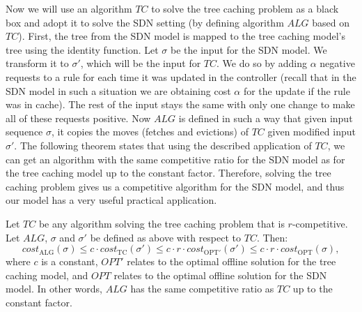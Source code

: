 Now we will use an algorithm $TC$ to solve the tree caching problem as a black
box and adopt it to solve the SDN setting (by defining algorithm $ALG$ based on
$TC$). First, the tree from the SDN model is mapped to the tree caching model's
tree using the identity function. Let $\sigma$ be the input for the SDN model. We
transform it to $\sigma'$, which will be the input for $TC$. We do so by adding
$\alpha$ negative requests to a rule for each time it was updated in the
controller (recall that in the SDN model in such a situation we are obtaining
cost $\alpha$ for the update if the rule was in cache). The rest of the input
stays the same with only one change to make all of these requests positive. Now
$ALG$ is defined in such a way that given input sequence $\sigma$, it copies the
moves (fetches and evictions) of $TC$ given modified input $\sigma'$. The
following theorem states that using the described application of $TC$, we can
get an algorithm with the same competitive ratio for the SDN model as for the
tree caching model up to the constant factor. Therefore, solving the tree
caching problem gives us a competitive algorithm for the SDN model, and thus 
our model has a very useful practical application.  \begin{theorem} Let
$TC$ be any algorithm solving the tree caching problem that is $r$-competitive.
Let $ALG$, $\sigma$ and $\sigma'$ be defined as above with respect to $TC$.
Then: $$cost_{\mathrm{ALG}}(\sigma) \leq c \cdot cost_{\mathrm{TC}}(\sigma')
\leq c \cdot r \cdot cost_{\mathrm{OPT'}}(\sigma') \leq c \cdot r \cdot
cost_{\mathrm{OPT}}(\sigma),$$ where $c$ is a constant, $OPT'$ relates to the
optimal offline solution for the tree caching model, and $OPT$ relates to the
optimal offline solution for the SDN model. In other words, $ALG$ has the same
competitive ratio as $TC$ up to the constant factor.  \end{theorem}
